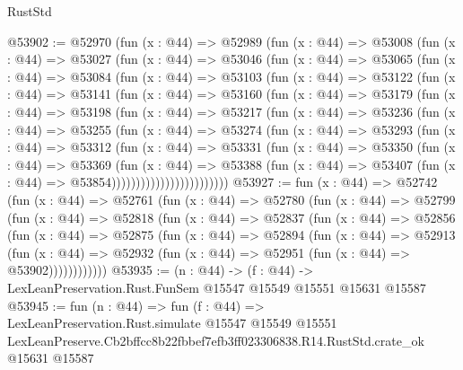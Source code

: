 \begin{lexlean}{RustStd}
\begin{coremodule}
@53902 := @52970
    (fun (x : @44) =>
    @52989
      (fun (x : @44) =>
      @53008
        (fun (x : @44) =>
        @53027
          (fun (x : @44) =>
          @53046
            (fun (x : @44) =>
            @53065
              (fun (x : @44) =>
              @53084
                (fun (x : @44) =>
                @53103
                  (fun (x : @44) =>
                  @53122
                    (fun (x : @44) =>
                    @53141
                      (fun (x : @44) =>
                      @53160
                        (fun (x : @44) =>
                        @53179
                          (fun (x : @44) =>
                          @53198
                            (fun (x : @44) =>
                            @53217
                              (fun (x : @44) =>
                              @53236
                                (fun (x : @44) =>
                                @53255
                                  (fun (x : @44) =>
                                  @53274
                                    (fun (x : @44) =>
                                    @53293
                                      (fun (x : @44) =>
                                      @53312
                                        (fun (x : @44) =>
                                        @53331
                                          (fun (x : @44) =>
                                          @53350
                                            (fun (x : @44) =>
                                            @53369
                                              (fun (x : @44) =>
                                              @53388
                                                (fun (x : @44) =>
                                                @53407
                                                  (fun (x : @44) => @53854))))))))))))))))))))))))
@53927 := fun (x : @44) =>
  @52742
    (fun (x : @44) =>
    @52761
      (fun (x : @44) =>
      @52780
        (fun (x : @44) =>
        @52799
          (fun (x : @44) =>
          @52818
            (fun (x : @44) =>
            @52837
              (fun (x : @44) =>
              @52856
                (fun (x : @44) =>
                @52875
                  (fun (x : @44) =>
                  @52894
                    (fun (x : @44) =>
                    @52913
                      (fun (x : @44) =>
                      @52932 (fun (x : @44) => @52951 (fun (x : @44) => @53902))))))))))))
@53935 := (n : @44) ->
  (f : @44) -> LexLeanPreservation.Rust.FunSem @15547 @15549 @15551 @15631 @15587
@53945 := fun (n : @44) =>
  fun (f : @44) =>
  LexLeanPreservation.Rust.simulate
    @15547
    @15549
    @15551
    LexLeanPreserve.Cb2bffcc8b22fbbef7efb3ff023306838.R14.RustStd.crate_ok
    @15631
    @15587
\end{coremodule}
\end{lexlean}
